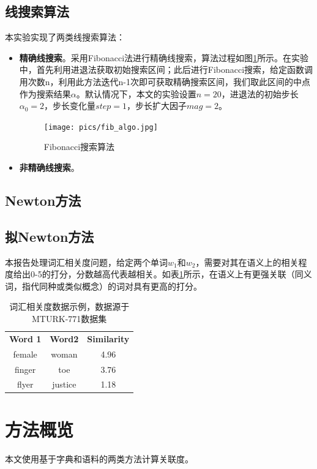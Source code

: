 \documentclass{article}
\begin{document}
\subsection{线搜索算法}
本实验实现了两类线搜索算法：
\begin{itemize}
  \item \textbf{精确线搜索}。采用Fibonacci法进行精确线搜索，算法过程如图\ref{fig:fib_algo}所示。在实验中，首先利用进退法获取初始搜索区间；此后进行Fibonacci搜索，给定函数调用次数n，利用此方法迭代n-1次即可获取精确搜索区间，我们取此区间的中点作为搜索结果$\alpha$。默认情况下，本文的实验设置$n=20$，进退法的初始步长$\alpha_0=2$，步长变化量$step=1$，步长扩大因子$mag=2$。
  \begin{figure}[h]
    \centering
    \texttt{[image: pics/fib\_algo.jpg]}
    \caption{Fibonacci搜索算法}
    \label{fig:fib_algo}
  \end{figure}
  \item \textbf{非精确线搜索}。
\end{itemize}



\subsection{Newton方法}

\subsection{拟Newton方法}

本报告处理词汇相关度问题，给定两个单词$w_1$和$w_2$，需要对其在语义上的相关程度给出0-5的打分，分数越高代表越相关。如表\ref{tab:dataset_eg}所示，在语义上有更强关联（同义词，指代同种或类似概念）的词对具有更高的打分。

\begin{table}[h]
  \centering
  \begin{tabular}{c c c}
    \toprule
    \bfseries Word 1 & \bfseries Word2 & \bfseries Similarity \\
    \cmidrule(lr){1-3}
    female & woman & 4.96 \\
    finger & toe & 3.76 \\
    flyer & justice & 1.18\\
    \bottomrule
  \end{tabular}
  \caption{词汇相关度数据示例，数据源于MTURK-771数据集}
  \label{tab:dataset_eg}
\end{table}

\section{方法概览}
本文使用基于字典和语料的两类方法计算关联度。
\end{document}
